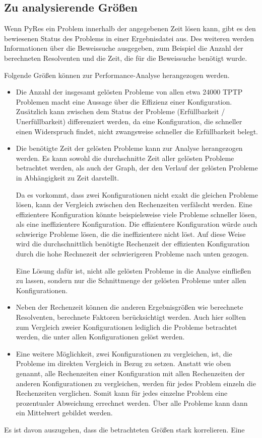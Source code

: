 	
	\subsection{Zu analysierende Größen}
	
	Wenn PyRes ein Problem innerhalb der angegebenen Zeit lösen kann, gibt es den bewiesenen Status des Problems in einer Ergebnisdatei aus. Des weiteren werden Informationen über die Beweissuche ausgegeben, zum Beispiel die Anzahl der berechneten Resolventen und die Zeit, die für die Beweissuche benötigt wurde.
	
	Folgende Größen können zur Performance-Analyse herangezogen werden.
	\begin{itemize}
		\item Die Anzahl der insgesamt gelösten Probleme von allen etwa 24000 TPTP Problemen macht eine Aussage über die Effizienz einer Konfiguration. Zusätzlich kann zwischen dem Status der Probleme (Erfüllbarkeit / Unerfüllbarkeit) differenziert werden, da eine Konfiguration, die schneller einen Widerspruch findet, nicht zwangsweise schneller die Erfüllbarkeit belegt.
		
		\item Die benötigte Zeit der gelösten Probleme kann zur Analyse herangezogen werden. Es kann sowohl die durchschnitte Zeit aller gelösten Probleme betrachtet werden, als auch der Graph, der den Verlauf der gelösten Probleme in Abhängigkeit zu Zeit darstellt.
		
		Da es vorkommt, dass zwei Konfigurationen nicht exakt die gleichen Probleme lösen, kann der Vergleich zwischen den Rechenzeiten verfälscht werden. Eine effizientere Konfiguration könnte beispielsweise viele Probleme schneller lösen, als eine ineffizientere Konfiguration. Die effizientere Konfiguration würde auch schwierige Probleme lösen, die die ineffizientere nicht löst. Auf diese Weise wird die durchschnittlich benötigte Rechenzeit der effizienten Konfiguration durch die hohe Rechnezeit der schwierigeren Probleme nach unten gezogen.
		
		Eine Lösung dafür ist, nicht alle gelösten Probleme in die Analyse einfließen zu lassen, sondern nur die Schnittmenge der gelösten Probleme unter allen Konfigurationen.
		
		\item Neben der Rechenzeit können die anderen Ergebnisgrößen wie berechnete Resolventen, berechnete Faktoren berücksichtigt werden. Auch hier sollten zum Vergleich zweier Konfigurationen lediglich die Probleme betrachtet werden, die unter allen Konfigurationen gelöst werden.
		
		\item Eine weitere Möglichkeit, zwei Konfigurationen zu vergleichen, ist, die Probleme im direkten Vergleich in Bezug zu setzen. Anstatt wie oben genannt, alle Rechenzeiten einer Konfiguration mit allen Rechenzeiten der anderen Konfigurationen zu vergleichen, werden für jedes Problem einzeln die Rechenzeiten verglichen. Somit kann für jedes einzelne Problem eine prozentualer Abweichung errechnet werden. Über alle Probleme kann dann ein Mittelwert gebildet werden.
	\end{itemize}
	Es ist davon auszugehen, dass die betrachteten Größen stark korrelieren. Eine 
